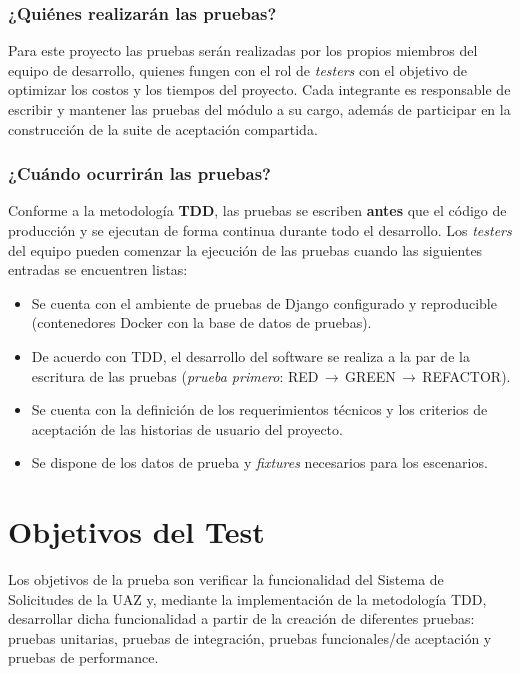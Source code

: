 \documentclass[12pt,letterpaper]{report}
\begin{document}
\subsection{¿Quiénes realizarán las pruebas?}

Para este proyecto las pruebas serán realizadas por los propios miembros del
equipo de desarrollo, quienes fungen con el rol de \emph{testers} con el
objetivo de optimizar los costos y los tiempos del proyecto. Cada integrante es
responsable de escribir y mantener las pruebas del módulo a su cargo, además de
participar en la construcción de la suite de aceptación compartida.

\subsection{¿Cuándo ocurrirán las pruebas?}

Conforme a la metodología \textbf{TDD}, las pruebas se escriben \textbf{antes}
que el código de producción y se ejecutan de forma continua durante todo el
desarrollo. Los \emph{testers} del equipo pueden comenzar la ejecución de las
pruebas cuando las siguientes entradas se encuentren listas:

\begin{itemize}[leftmargin=*]
  \item Se cuenta con el ambiente de pruebas de Django configurado y
  reproducible (contenedores Docker con la base de datos de pruebas).
  \item De acuerdo con TDD, el desarrollo del software se realiza a la par de la
  escritura de las pruebas (\emph{prueba primero}: RED\,$\rightarrow$\,GREEN\,$\rightarrow$\,REFACTOR).
  \item Se cuenta con la definición de los requerimientos técnicos y los
  criterios de aceptación de las historias de usuario del proyecto.
  \item Se dispone de los datos de prueba y \emph{fixtures} necesarios para los
  escenarios.
\end{itemize}

\chapter{Objetivos del Test}

Los objetivos de la prueba son verificar la funcionalidad del Sistema de
Solicitudes de la UAZ y, mediante la implementación de la metodología TDD,
desarrollar dicha funcionalidad a partir de la creación de diferentes pruebas:
pruebas unitarias, pruebas de integración, pruebas funcionales/de aceptación y
pruebas de performance.
\end{document}
